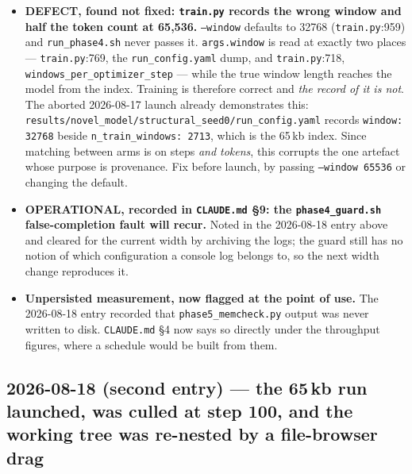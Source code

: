 \documentclass[11pt,a4paper]{article}
\newcommand{\code}[1]{\texttt{\small #1}}
\begin{document}
\begin{itemize}
\item \textbf{DEFECT, found not fixed: \code{train.py} records the wrong window
and half the token count at 65{,}536.} \code{--window} defaults to 32768
(\code{train.py}:959) and \code{run\_phase4.sh} never passes it. \code{args.window}
is read at exactly two places --- \code{train.py}:769, the \code{run\_config.yaml}
dump, and \code{train.py}:718, \code{windows\_per\_optimizer\_step} --- while the
true window length reaches the model from the index. Training is therefore
correct and \emph{the record of it is not}. The aborted 2026-08-17 launch already
demonstrates this: \code{results/novel\_model/structural\_seed0/run\_config.yaml}
records \code{window: 32768} beside \code{n\_train\_windows: 2713}, which is the
65\,kb index. Since matching between arms is on steps \emph{and tokens}, this
corrupts the one artefact whose purpose is provenance. Fix before launch, by
passing \code{--window 65536} or changing the default.

\item \textbf{OPERATIONAL, recorded in \code{CLAUDE.md} \S9: the
\code{phase4\_guard.sh} false-completion fault will recur.} Noted in the
2026-08-18 entry above and cleared for the current width by archiving the logs;
the guard still has no notion of which configuration a console log belongs to,
so the next width change reproduces it.

\item \textbf{Unpersisted measurement, now flagged at the point of use.} The
2026-08-18 entry recorded that \code{phase5\_memcheck.py} output was never
written to disk. \code{CLAUDE.md} \S4 now says so directly under the throughput
figures, where a schedule would be built from them.

\end{itemize}


\subsection*{2026-08-18 (second entry) --- the 65\,kb run launched, was culled
at step 100, and the working tree was re-nested by a file-browser drag}
\end{document}
